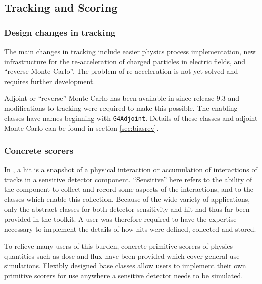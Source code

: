 \label{sec:trackscore}
\subsection{\textbf{Tracking and Scoring}}

\subsubsection{Design changes in tracking}

The main changes in tracking include easier physics process implementation, new
infrastructure for the re-acceleration of charged particles in electric fields, 
and ``reverse Monte Carlo''.  The problem of re-acceleration is not yet solved 
and requires further development.

Adjoint or ``reverse'' Monte Carlo has been available in \Gfour{} since release 
9.3 and modifications to tracking were required to make this possible.  The 
enabling classes have names beginning with \texttt{G4Adjoint}.  Details of these 
classes and adjoint Monte Carlo can be found in section \ref{sec:biasrev}.

\subsubsection{Concrete scorers}

In \Gfour{}, a hit is a snapshot of a physical interaction or accumulation of 
interactions of tracks in a sensitive detector component.  ``Sensitive'' here
refers to the ability of the component to collect and record some aspects of 
the interactions, and to the \Gfour{} classes which enable this collection.
Because of the wide variety of \Gfour{} applications, only the abstract classes
for both detector sensitivity and hit had thus far been provided in the toolkit.
A user was therefore required to have the expertise necessary to implement the 
details of how hits were defined, collected and stored.

To relieve many users of this burden, concrete primitive scorers of physics 
quantities such as dose and flux have been provided which cover general-use 
simulations.  Flexibly designed base classes allow users to implement their own
primitive scorers for use anywhere a sensitive detector needs to be simulated.

